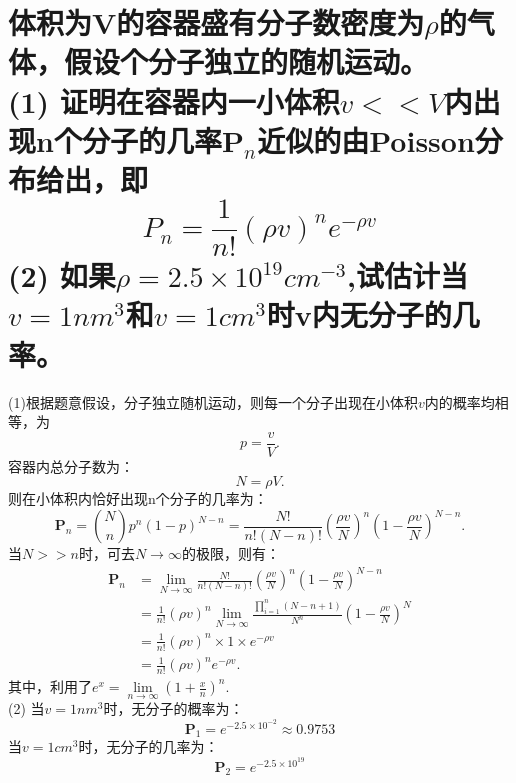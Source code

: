 \documentclass[reqno,a4paper,12pt]{amsart}
\begin{document}
\section{体积为V的容器盛有分子数密度为$\rho$的气体，假设个分子独立的随机运动。 \\
(1) 证明在容器内一小体积$v<<V$内出现n个分子的几率$\mathbf{P}_n$近似的由Poisson分布给出，即
\[
	P_n = \frac{1}{n!}(\rho v)^n e^{-\rho v}
\]
(2) 如果$\rho = 2.5\times 10^{19}cm^{-3}$,试估计当$v = 1nm^3$和$v = 1cm^3$时v内无分子的几率。}
\begin{tcolorbox}[breakable, colback = black!5!white, colframe = black]
(1)根据题意假设，分子独立随机运动，则每一个分子出现在小体积$v$内的概率均相等，为
\[
	p = \frac{v}{V}.
\]
容器内总分子数为：
\[
	N = \rho V.
\]
则在小体积内恰好出现n个分子的几率为：
\[
	\mathbf{P}_n = \binom{N}{n}p^n(1-p)^{N-n} = \frac{N!}{n!(N-n)!}\left( \frac{\rho v}{N} \right)^n \left( 1 - \frac{\rho v}{N} \right)^{N-n}.
\]
当$N>>n$时，可去$N \to \infty$的极限，则有：
\begin{align*}
	\mathbf{P}_n &= \lim_{N\to \infty} \frac{N!}{n!(N-n)!}\left( \frac{\rho v}{N} \right)^n \left( 1 - \frac{\rho v}{N} \right)^{N-n} \\
	&= \frac{1}{n!}(\rho v)^n \lim_{N\to \infty} \frac{ \prod\limits_{i=1}^n (N-n+1)}{N^n} \left( 1 - \frac{\rho v}{N} \right)^N \\
	&= \frac{1}{n!}(\rho v)^n\times 1 \times e^{-\rho v} \\
	&= \frac{1}{n!}(\rho v)^n e^{-\rho v}.
\end{align*}
其中，利用了$e^x = \lim\limits_{n\to \infty} \left( 1 + \frac{x}{n} \right)^n$. \\
(2) 当$v = 1nm^3$时，无分子的概率为：
\[
	\mathbf{P}_1 = e^{-2.5\times 10^{-2}} \approx 0.9753
\]
当$v = 1cm^3$时，无分子的几率为：
\[
	\mathbf{P}_2 = e^{-2.5\times 10^{19}}
\]
\end{tcolorbox}
\end{document}
